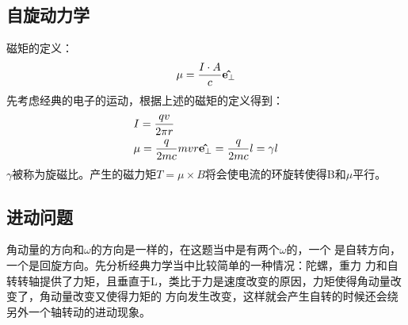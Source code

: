 \documentclass[UTF8]{article}
\numberwithin{equation}{section}
\begin{document}
\subsection{自旋动力学}
磁矩的定义：
\begin{align*}
    \mu = \frac{I\cdot A}{c}\vu{e_{\bot }}
\end{align*}
先考虑经典的电子的运动，根据上述的磁矩的定义得到：
\begin{align*}
     & I=\frac{qv}{2\pi r}                                       \\
     & \mu =\frac{q}{2mc}mvr\vu{e_\bot}= \frac{q}{2mc}l=\gamma l
\end{align*}
$\gamma$被称为旋磁比。产生的磁力矩$T=\mu\times B$将会使电流的环旋转使得B和$\mu$平行。
\subsection{进动问题}
角动量的方向和$\omega$的方向是一样的，在这题当中是有两个$\omega$的，一个
是自转方向，一个是回旋方向。先分析经典力学当中比较简单的一种情况：陀螺，重力
力和自转转轴提供了力矩，且垂直于L，类比于力是速度改变的原因，力矩使得角动量改变了，角动量改变又使得力矩的
方向发生改变，这样就会产生自转的时候还会绕另外一个轴转动的进动现象。
\end{document}

